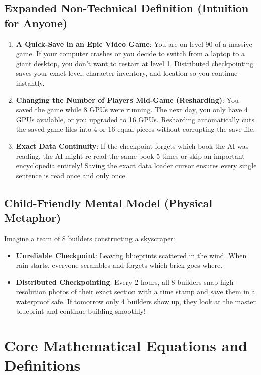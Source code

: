 \documentclass[11pt,a4paper]{article}
\theoremstyle{definition}
\begin{document}
\subsection{Expanded Non-Technical Definition (Intuition for Anyone)}
\begin{enumerate}
    \item \textbf{A Quick-Save in an Epic Video Game}: You are on level 90 of a massive game. If your computer crashes or you decide to switch from a laptop to a giant desktop, you don't want to restart at level 1. Distributed checkpointing saves your exact level, character inventory, and location so you continue instantly.
    \item \textbf{Changing the Number of Players Mid-Game (Resharding)}: You saved the game while 8 GPUs were running. The next day, you only have 4 GPUs available, or you upgraded to 16 GPUs. Resharding automatically cuts the saved game files into 4 or 16 equal pieces without corrupting the save file.
    \item \textbf{Exact Data Continuity}: If the checkpoint forgets which book the AI was reading, the AI might re-read the same book 5 times or skip an important encyclopedia entirely! Saving the exact data loader cursor ensures every single sentence is read once and only once.
\end{enumerate}

\subsection{Child-Friendly Mental Model (Physical Metaphor)}
Imagine a team of 8 builders constructing a skyscraper:
\begin{itemize}
    \item \textbf{Unreliable Checkpoint}: Leaving blueprints scattered in the wind. When rain starts, everyone scrambles and forgets which brick goes where.
    \item \textbf{Distributed Checkpointing}: Every 2 hours, all 8 builders snap high-resolution photos of their exact section with a time stamp and save them in a waterproof safe. If tomorrow only 4 builders show up, they look at the master blueprint and continue building smoothly!
\end{itemize}

\section{Core Mathematical Equations and Definitions}
\end{document}
